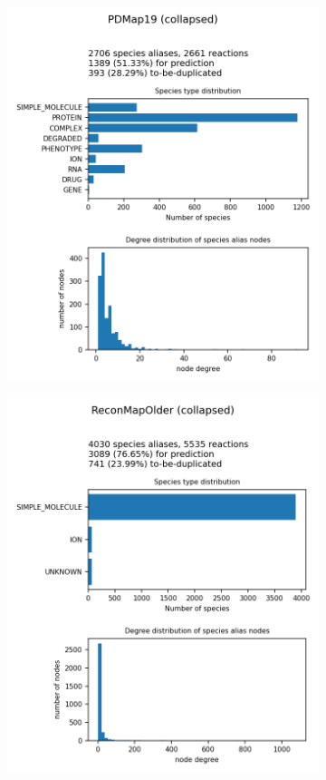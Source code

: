 \documentclass[
	fontsize=10pt, %
	twoside=false, %
	secnumdepth=1, %
  toc=indentunnumbered %
]{kaobook}
\begin{document}
\begin{figure}[h]
\begin{subfigure}{0.32\textwidth}
    \includegraphics[width=\linewidth]{generated/PDMap19.png}
  \end{subfigure} 
  \begin{subfigure}{0.32\textwidth}
    \includegraphics[width=\linewidth]{generated/ReconMapOlder.png}

\end{subfigure}
\end{figure}
\end{document}
